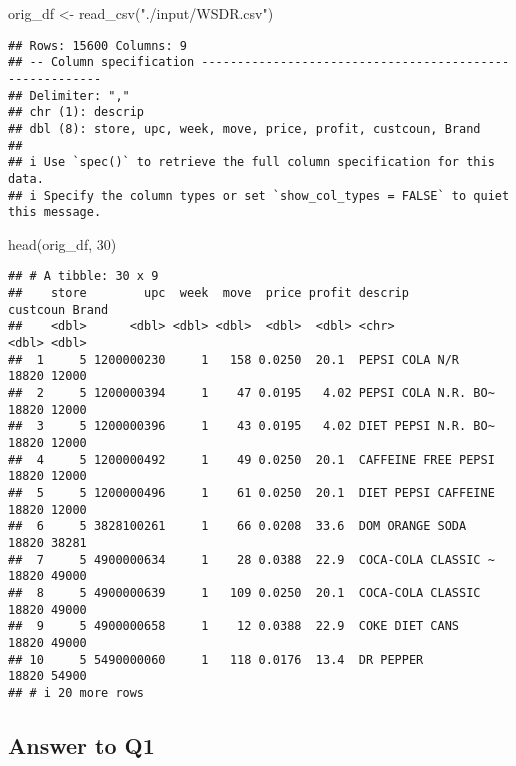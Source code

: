 \documentclass[
]{article}
\newenvironment{Shaded}{\begin{snugshade}}{\end{snugshade}}
\newcommand{\DecValTok}[1]{\textcolor[rgb]{0.00,0.00,0.81}{#1}}
\newcommand{\FunctionTok}[1]{\textcolor[rgb]{0.00,0.00,0.00}{#1}}
\newcommand{\NormalTok}[1]{#1}
\newcommand{\OtherTok}[1]{\textcolor[rgb]{0.56,0.35,0.01}{#1}}
\newcommand{\StringTok}[1]{\textcolor[rgb]{0.31,0.60,0.02}{#1}}
\begin{document}
\begin{Shaded}
\begin{Highlighting}[]
\NormalTok{orig\_df }\OtherTok{\textless{}{-}} \FunctionTok{read\_csv}\NormalTok{(}\StringTok{"./input/WSDR.csv"}\NormalTok{)}
\end{Highlighting}
\end{Shaded}

\begin{verbatim}
## Rows: 15600 Columns: 9
## -- Column specification --------------------------------------------------------
## Delimiter: ","
## chr (1): descrip
## dbl (8): store, upc, week, move, price, profit, custcoun, Brand
## 
## i Use `spec()` to retrieve the full column specification for this data.
## i Specify the column types or set `show_col_types = FALSE` to quiet this message.
\end{verbatim}

\begin{Shaded}
\begin{Highlighting}[]
\FunctionTok{head}\NormalTok{(orig\_df, }\DecValTok{30}\NormalTok{)}
\end{Highlighting}
\end{Shaded}

\begin{verbatim}
## # A tibble: 30 x 9
##    store        upc  week  move  price profit descrip             custcoun Brand
##    <dbl>      <dbl> <dbl> <dbl>  <dbl>  <dbl> <chr>                  <dbl> <dbl>
##  1     5 1200000230     1   158 0.0250  20.1  PEPSI COLA N/R         18820 12000
##  2     5 1200000394     1    47 0.0195   4.02 PEPSI COLA N.R. BO~    18820 12000
##  3     5 1200000396     1    43 0.0195   4.02 DIET PEPSI N.R. BO~    18820 12000
##  4     5 1200000492     1    49 0.0250  20.1  CAFFEINE FREE PEPSI    18820 12000
##  5     5 1200000496     1    61 0.0250  20.1  DIET PEPSI CAFFEINE    18820 12000
##  6     5 3828100261     1    66 0.0208  33.6  DOM ORANGE SODA        18820 38281
##  7     5 4900000634     1    28 0.0388  22.9  COCA-COLA CLASSIC ~    18820 49000
##  8     5 4900000639     1   109 0.0250  20.1  COCA-COLA CLASSIC      18820 49000
##  9     5 4900000658     1    12 0.0388  22.9  COKE DIET CANS         18820 49000
## 10     5 5490000060     1   118 0.0176  13.4  DR PEPPER              18820 54900
## # i 20 more rows
\end{verbatim}

\hypertarget{answer-to-q1}{%
\subsection{Answer to Q1}\label{answer-to-q1}}
\end{document}
